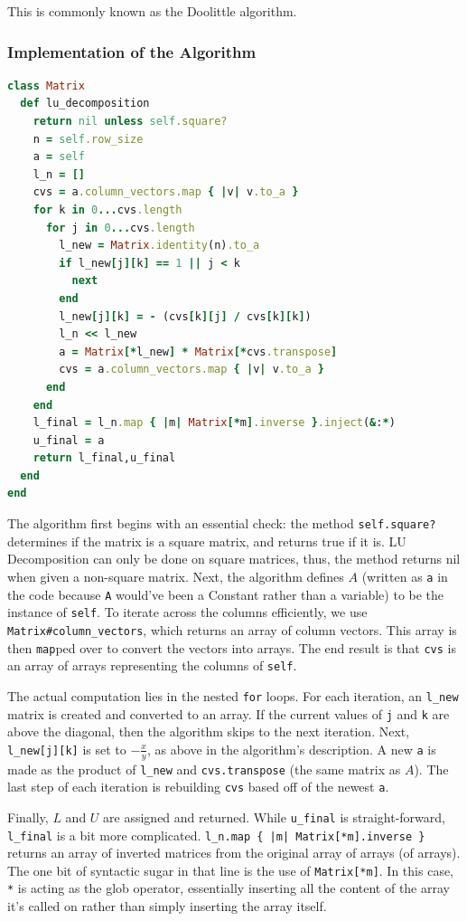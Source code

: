 \documentclass[letterpaper,12pt]{article}
\begin{document}
This is commonly known as the Doolittle algorithm.

\subsubsection{Implementation of the Algorithm}

\lstset{caption=LU Decomposition}
\begin{lstlisting}[language=ruby]
class Matrix
  def lu_decomposition
    return nil unless self.square?
    n = self.row_size
    a = self
    l_n = []
    cvs = a.column_vectors.map { |v| v.to_a }
    for k in 0...cvs.length
      for j in 0...cvs.length
        l_new = Matrix.identity(n).to_a
        if l_new[j][k] == 1 || j < k
          next
        end
        l_new[j][k] = - (cvs[k][j] / cvs[k][k])
        l_n << l_new
        a = Matrix[*l_new] * Matrix[*cvs.transpose]
        cvs = a.column_vectors.map { |v| v.to_a }
      end
    end
    l_final = l_n.map { |m| Matrix[*m].inverse }.inject(&:*)
    u_final = a
    return l_final,u_final
  end
end
\end{lstlisting}

The algorithm first begins with an essential check: the method
\texttt{self.square?} determines if the matrix is a square matrix, and returns
true if it is.
LU Decomposition can only be done on square matrices, thus, the method returns
nil when given a non-square matrix.
Next, the algorithm defines $A$ (written as \texttt{a} in the code because
\texttt{A} would've been a Constant rather than a variable) to be the instance
of \texttt{self}.
To iterate across the columns efficiently, we use
\texttt{Matrix\#column\_vectors}, which returns an array of column vectors.
This array is then \texttt{map}ped over to convert the vectors into arrays.
The end result is that \texttt{cvs} is an array of arrays representing the
columns of \texttt{self}.

The actual computation lies in the nested \texttt{for} loops.
For each iteration, an \texttt{l\_new} matrix is created and converted to an
array.
If the current values of \texttt{j} and \texttt{k} are above the diagonal,
then the algorithm skips to the next iteration.
Next, \texttt{l\_new[j][k]} is set to $-\frac{x}{y}$, as above in the
algorithm's description.
A new \texttt{a} is made as the product of \texttt{l\_new} and
\texttt{cvs.transpose} (the same matrix as $A$).
The last step of each iteration is rebuilding \texttt{cvs} based off of the
newest \texttt{a}.

Finally, $L$ and $U$ are assigned and returned.
While \texttt{u\_final} is straight-forward, \texttt{l\_final} is a bit more
complicated.
\texttt{l\_n.map \{ |m| Matrix[*m].inverse \}} returns an array of inverted
matrices from the original array of arrays (of arrays).
The one bit of syntactic sugar in that line is the use of \texttt{Matrix[*m]}.
In this case, \texttt{*} is acting as the glob operator, essentially inserting
all the content of the array it's called on rather than simply inserting the
array itself.
\end{document}
